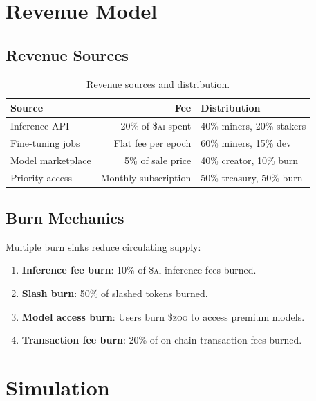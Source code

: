 \documentclass[11pt,letterpaper]{article}
\newcommand{\AI}{\$\textsc{ai}}
\newcommand{\ZOO}{\$\textsc{zoo}}
\begin{document}
\section{Revenue Model}
\label{sec:revenue}

\subsection{Revenue Sources}

\begin{table}[t]
\centering
\begin{tabular}{lrl}
\toprule
\textbf{Source} & \textbf{Fee} & \textbf{Distribution} \\
\midrule
Inference API & 20\% of \AI{} spent & 40\% miners, 20\% stakers \\
Fine-tuning jobs & Flat fee per epoch & 60\% miners, 15\% dev \\
Model marketplace & 5\% of sale price & 40\% creator, 10\% burn \\
Priority access & Monthly subscription & 50\% treasury, 50\% burn \\
\bottomrule
\end{tabular}
\caption{Revenue sources and distribution.}
\label{tab:revenue}
\end{table}

\subsection{Burn Mechanics}

Multiple burn sinks reduce circulating supply:

\begin{enumerate}
    \item \textbf{Inference fee burn}: 10\% of \AI{} inference fees burned.
    \item \textbf{Slash burn}: 50\% of slashed tokens burned.
    \item \textbf{Model access burn}: Users burn \ZOO{} to access premium models.
    \item \textbf{Transaction fee burn}: 20\% of on-chain transaction fees burned.
\end{enumerate}

\section{Simulation}
\label{sec:simulation}
\end{document}
